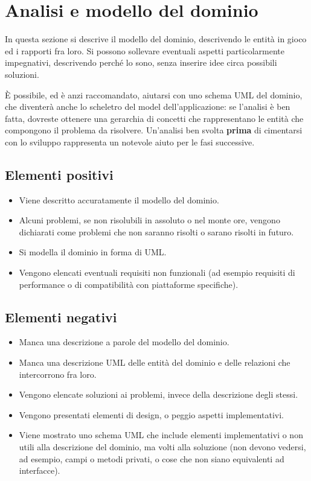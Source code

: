\documentclass[a4paper,12pt]{report}
\begin{document}
\section{Analisi e modello del dominio}

In questa sezione si descrive il modello del dominio, descrivendo le entità in gioco ed i rapporti fra loro.
%
Si possono sollevare eventuali aspetti particolarmente impegnativi, descrivendo perché lo sono, senza inserire idee circa possibili soluzioni.

È possibile, ed è anzi raccomandato, aiutarsi con uno schema UML del dominio, che diventerà anche lo scheletro del model dell'applicazione: se l'analisi è ben fatta, dovreste ottenere una gerarchia di concetti che rappresentano le entità che compongono il problema da risolvere.
%
Un'analisi ben svolta \textbf{prima} di cimentarsi con lo sviluppo rappresenta un notevole aiuto per le fasi successive.

\subsection*{Elementi positivi}
\begin{itemize}
	\item Viene descritto accuratamente il modello del dominio.
	\item Alcuni problemi, se non risolubili in assoluto o nel monte ore, vengono dichiarati come problemi che non saranno risolti o sarano risolti in futuro.
	\item Si modella il dominio in forma di UML.
	\item Vengono elencati eventuali requisiti non funzionali (ad esempio requisiti di performance o di compatibilità con piattaforme specifiche).
\end{itemize}

\subsection*{Elementi negativi}
\begin{itemize}
	\item Manca una descrizione a parole del modello del dominio.
	\item Manca una descrizione UML delle entità del dominio e delle relazioni che intercorrono fra loro.
	\item Vengono elencate soluzioni ai problemi, invece della descrizione degli stessi.
	\item Vengono presentati elementi di design, o peggio aspetti implementativi.
	\item Viene mostrato uno schema UML che include elementi implementativi o non utili alla descrizione del dominio, ma volti alla soluzione (non devono vedersi, ad esempio, campi o metodi privati, o cose che non siano equivalenti ad interfacce).
\end{itemize}
\end{document}
